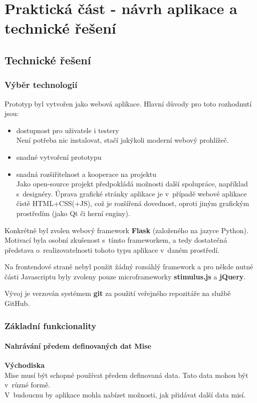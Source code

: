 \chapter{Praktická část - návrh aplikace a technické řešení}


\section{Technické řešení}
\subsection{Výběr technologií}
Prototyp byl vytvořen jako webová aplikace.
Hlavní důvody pro toto rozhodnutí jsou:
\begin{itemize}
	\item dostupnost pro uživatele i testery\\
	Není potřeba nic instalovat, stačí jakýkoli moderní webový prohlížeč.
	\item snadné vytvoření prototypu
	\item snadná rozšiřitelnost a kooperace na projektu\\ Jako open-source projekt předpokládá možnosti další spolupráce, například s~designéry. Úprava grafické stránky aplikace je v~případě webové aplikace čistě HTML+CSS(+JS), což je rozšířená dovednost, oproti jiným grafickým prostředím (jako Qt či herní enginy).
\end{itemize}

Konkrétně byl zvolen webový framework \textbf{Flask} (založeného na jazyce Python). Motivací byla osobní zkušenost s~tímto frameworkem, a tedy dostatečná představa o~realizovatelnosti tohoto typu aplikace v~daném prostředí.

Na frontendové straně nebyl použit žádný rozsáhlý framework a pro někde nutné části Javascriptu byly zvoleny pouze microframeworky \textbf{stimulus.js} a \textbf{jQuery}.

Vývoj je verzován systémem \textbf{git} za použití veřejného repozitáře na službě GitHub.

\subsection{Základní funkcionality}
\subsubsection*{Nahrávání předem definovaných dat Mise}
	\textbf{Východiska}\\
	Mise musí být schopné používat předem definovaná data. Tato data mohou být v~různé formě.\\
	V~budoucnu by aplikace mohla nabízet možnosti, jak přidávat další data misí.
	
